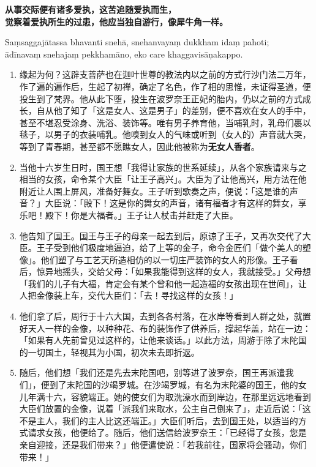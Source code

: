 \textbf{从事交际便有诸多爱执，这苦追随爱执而生，\\}
\textbf{觉察着爱执所生的过患，他应当独自游行，像犀牛角一样。}

Saṃsaggajātassa bhavanti snehā, snehanvayaṃ dukkham idaṃ pahoti;\\
ādīnavaṃ snehajaṃ pekkhamāno, eko care khaggavisāṇakappo. %

\begin{enumerate}\item 缘起为何？这辟支菩萨也在迦叶世尊的教法内以之前的方式行沙门法二万年，作了遍的遍作后，生起了初禅，确定了名色，作了相的思惟，未证得圣道，便投生到了梵界。他从此下堕，投生在波罗奈王正妃的胎内，仍以之前的方式成长，自从他了知了「这是女人、这是男子」的差别，便不喜欢在女人的手中，甚至不堪忍受涂身、洗浴、装饰等。唯有男子养育他，当哺乳时，乳母们裹以毯子，以男子的衣装哺乳。他嗅到女人的气味或听到（女人的）声音就大哭，等到了青春期，甚至都不愿瞧女人，因此他被称为\textbf{无女人香者}。
\item 当他十六岁生日时，国王想「我得让家族的世系延续」，从各个家族请来与之相当的女孩，命令某个大臣「让王子高兴」。大臣为了让他高兴，用方法在他附近让人围上屏风，准备好舞女。王子听到歌奏之声，便说：「这是谁的声音？」大臣说：「殿下！这是你的舞女的声音，诸有福者才有这样的舞女，享乐吧！殿下！你是大福者。」王子让人杖击并赶走了大臣。
\item 他告知了国王。国王与王子的母亲一起去到后，原谅了王子，又再次交代了大臣。王子受到他们极度地逼迫，给了上等的金子，命令金匠们「做个美人的塑像」。他们塑了与工艺天所造相仿的以一切庄严装饰的女人的形像。王子看后，惊异地摇头，交给父母：「如果我能得到这样的女人，我就接受。」父母想「我们的儿子有大福，肯定会有某个曾和他一起造福的女孩出现在世间」，让人把金像装上车，交代大臣们：「去！寻找这样的女孩！」
\item 他们拿了后，周行于十六大国，去到各各村落，在水岸等看到人群之处，就置好天人一样的金像，以种种花、布的装饰作了供养后，撑起华盖，站在一边：「如果有人先前曾见过这样的，让他来谈话。」以此方法，周游于除了末陀国的一切国土，轻视其为小国，初次未去即折返。
\item 随后，他们想「我们还是先去末陀国吧，别等进了波罗奈，国王再派遣我们」，便到了末陀国的沙竭罗城。在沙竭罗城，有名为末陀婆的国王，他的女儿年满十六，容貌端正。她的使女们为取洗澡水而到岸边，在那里远远地看到大臣们放置的金像，说着「派我们来取水，公主自己倒来了」，走近后说：「这不是主人，我们的主人比这还端正。」大臣们听后，去到国王处，以适当的方式请求女孩，他便给了。随后，他们送信给波罗奈王：「已经得了女孩，您是亲自迎接，还是我们带来？」他便遣使说：「若我前往，国家将会骚动，你们带来！」

\end{enumerate}
